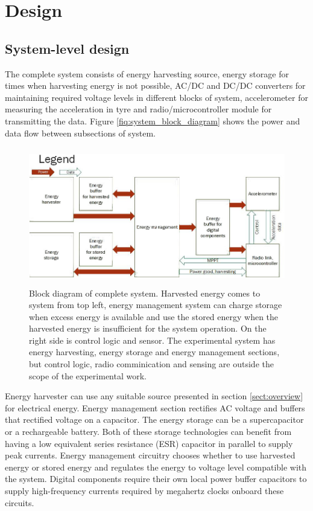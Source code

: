 \section{Design}
\subsection{System-level design}
The complete system consists of energy harvesting source, energy storage for times when harvesting energy is not possible, AC/DC and DC/DC converters for maintaining required voltage levels in different blocks of system, accelerometer for measuring the acceleration in tyre and radio/microcontroller module for transmitting the data. Figure \ref{fiq:system_block_diagram} shows the power and data flow between subsections of system. 


\begin{figure}[htb]
\begin{center}
\includegraphics[height=6cm]{images/own_dwg/system_block_diagram.jpg}
\end{center}
\caption{\label{fiq:system_block_diagram} Block diagram of complete system. Harvested energy comes to system from top left, energy management system can charge storage when excess energy is available and use the stored energy when the harvested energy is insufficient for the system operation. On the right side is control logic and sensor. The experimental system has energy harvesting, energy storage and energy management sections, but control logic, radio comminication and sensing are outside the scope of the experimental work.}
\label{liitekuva}
\end{figure}

Energy harvester can use any suitable source presented in section \ref{sect:overview} for electrical energy. Energy management section rectifies AC voltage and buffers that rectified voltage on a capacitor. The energy storage can be a supercapacitor or a rechargeable battery. Both of these storage technologies can benefit from having a low equivalent series resistance (ESR) capacitor in parallel to supply peak currents. Energy management circuitry chooses whether to use harvested energy or stored energy and regulates the energy to voltage level compatible with the system. Digital components require their own local power buffer capacitors to supply high-frequency currents required by megahertz clocks onboard these circuits.

